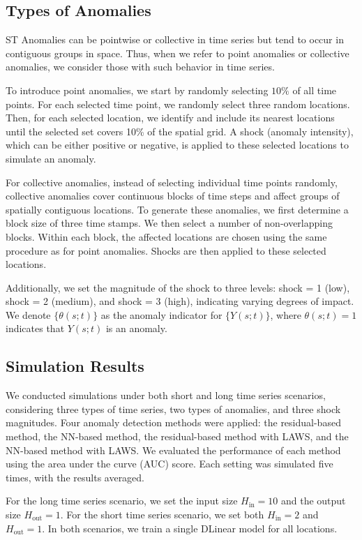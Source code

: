 \documentclass[11pt]{article}
\begin{document}
\subsection{Types of Anomalies}
ST Anomalies can be pointwise or collective in time series but tend to occur in contiguous groups in space. Thus, when we refer to point anomalies or collective anomalies, we consider those with such behavior in time series. 

To introduce point anomalies, we start by randomly selecting $10\%$ of all time points. For each selected time point, we randomly select three random locations. Then, for each selected location, we identify and include its nearest locations until the selected set covers 10\% of the spatial grid. A shock (anomaly intensity), which can be either positive or negative, is applied to these selected locations to simulate an anomaly.


For collective anomalies, instead of selecting individual time points randomly, collective anomalies cover continuous blocks of time steps and affect groups of spatially contiguous locations. To generate these anomalies, we first determine a block size of three time stamps. We then select a number of non-overlapping blocks. Within each block, the affected locations are chosen using the same procedure as for point anomalies. Shocks are then applied to these selected locations.

Additionally, we set the magnitude of the shock to three levels: shock = 1 (low), shock = 2 (medium), and shock = 3 (high), indicating varying degrees of impact. We denote $\{\theta(s;t)\}$ as the anomaly indicator for $\{Y(s;t)\}$, where $\theta(s;t) = 1$ indicates that $Y(s;t)$ is an anomaly.




\subsection{Simulation Results}
We conducted simulations under both short and long time series scenarios, considering three types of time series, two types of anomalies, and three shock magnitudes. Four anomaly detection methods were applied: the residual-based method, the NN-based method, the residual-based method with LAWS, and the NN-based method with LAWS. We evaluated the performance of each method using the area under the curve (AUC) score. Each setting was simulated five times, with the results averaged.


For the long time series scenario, we set the input size $H_{\mathrm{in}}=10$ and the output size $H_{\mathrm{out}}=1$. For the short time series scenario, we set both $H_{\mathrm{in}}=2$ and $H_{\mathrm{out}}=1$. In both scenarios, we train a single DLinear model for all locations.
\end{document}
